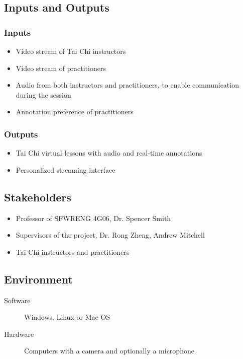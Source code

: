 \documentclass{article}
\begin{document}
\subsection{Inputs and Outputs}

\subsubsection{Inputs}

\begin{itemize}
\item Video stream of Tai Chi instructors
\item Video stream of practitioners
\item Audio from both instructors and practitioners, to enable communication during
  the session
\item Annotation preference of practitioners
\end{itemize}

\subsubsection{Outputs}

\begin{itemize}
\item Tai Chi virtual lessons with audio and real-time annotations
\item Personalized streaming interface
\end{itemize}

\subsection{Stakeholders}

\begin{itemize}
\item Professor of SFWRENG 4G06, Dr. Spencer Smith
\item Supervisors of the project, Dr. Rong Zheng, Andrew Mitchell
\item Tai Chi instructors and practitioners
\end{itemize}

\subsection{Environment}

\begin{description}
\item[Software] Windows, Linux or Mac OS
\item[Hardware] Computers with a camera and optionally a microphone
\end{description}
\end{document}

